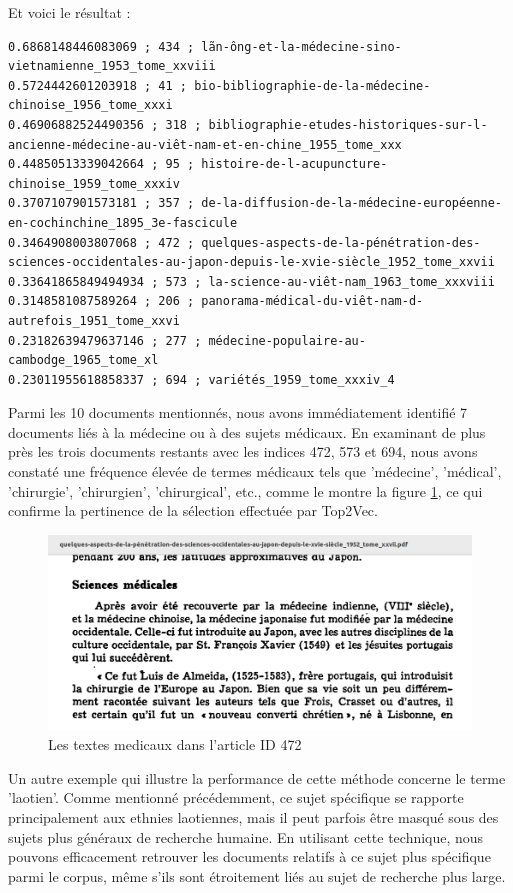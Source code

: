 Et voici le résultat :
\begin{lstlisting}
0.6868148446083069 ; 434 ; lãn-ông-et-la-médecine-sino-vietnamienne_1953_tome_xxviii
0.5724442601203918 ; 41 ; bio-bibliographie-de-la-médecine-chinoise_1956_tome_xxxi
0.46906882524490356 ; 318 ; bibliographie-etudes-historiques-sur-l-ancienne-médecine-au-viêt-nam-et-en-chine_1955_tome_xxx
0.44850513339042664 ; 95 ; histoire-de-l-acupuncture-chinoise_1959_tome_xxxiv
0.3707107901573181 ; 357 ; de-la-diffusion-de-la-médecine-européenne-en-cochinchine_1895_3e-fascicule
0.3464908003807068 ; 472 ; quelques-aspects-de-la-pénétration-des-sciences-occidentales-au-japon-depuis-le-xvie-siècle_1952_tome_xxvii
0.33641865849494934 ; 573 ; la-science-au-viêt-nam_1963_tome_xxxviii
0.3148581087589264 ; 206 ; panorama-médical-du-viêt-nam-d-autrefois_1951_tome_xxvi
0.23182639479637146 ; 277 ; médecine-populaire-au-cambodge_1965_tome_xl
0.23011955618858337 ; 694 ; variétés_1959_tome_xxxiv_4
\end{lstlisting}

Parmi les 10 documents mentionnés, nous avons immédiatement identifié 7 documents liés à la médecine ou à des sujets médicaux. En examinant de plus près les trois documents restants avec les indices 472, 573 et 694, nous avons constaté une fréquence élevée de termes médicaux tels que 'médecine', 'médical', 'chirurgie', 'chirurgien', 'chirurgical', etc., comme le montre la figure \ref{fig:medical}, ce qui confirme la pertinence de la sélection effectuée par Top2Vec.

\begin{figure}[H] %
    \centering
    \includegraphics[width=14cm]{img/preuve_medecine_Top2Vec.png}
    \caption{Les textes medicaux dans l'article ID 472}
    \label{fig:medical}
\end{figure}

Un autre exemple qui illustre la performance de cette méthode concerne le terme 'laotien'. Comme mentionné précédemment, ce sujet spécifique se rapporte principalement aux ethnies laotiennes, mais il peut parfois être masqué sous des sujets plus généraux de recherche humaine. En utilisant cette technique, nous pouvons efficacement retrouver les documents relatifs à ce sujet plus spécifique parmi le corpus, même s'ils sont étroitement liés au sujet de recherche plus large.

